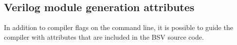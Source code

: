 \documentclass[twoside,letterpaper]{article}
\begin{document}



\subsection{Verilog module generation attributes}
\label{sec-modgenattrib}

In addition to compiler flags on the command line, it is possible to
guide the compiler with attributes that are included in the BSV source
code.
\end{document}
